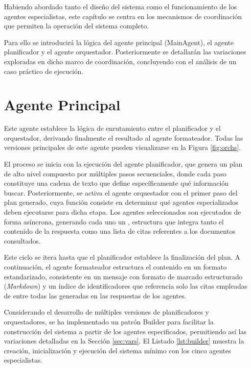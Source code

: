 Habiendo abordado tanto el diseño del sistema como el funcionamiento de los agentes especialistas, este capítulo se centra en los mecanismos de coordinación que permiten la operación del sistema completo.

Para ello se introducirá la lógica del agente principal (MainAgent), el agente planificador y el agente orquestador. Posteriormente se detallarán las variaciones exploradas en dicho marco de coordinación, concluyendo con el análisis de un caso práctico de ejecución.

\section{Agente Principal}
\label{sec:principal}
Este agente establece la lógica de enrutamiento entre el planificador y el orquestador, derivando finalmente el resultado al agente formateador. Todas las versiones principales de este agente pueden visualizarse en la Figura \ref{fig:orchs}.

El proceso se inicia con la ejecución del agente planificador, que genera un plan de alto nivel compuesto por múltiples pasos secuenciales, donde cada paso constituye una cadena de texto que define específicamente qué información buscar. Posteriormente, se activa el agente orquestador con el primer paso del plan generado, cuya función consiste en determinar qué agentes especializados deben ejecutarse para dicha etapa. Los agentes seleccionados son ejecutados de forma asíncrona, generando cada uno un , estructura que integra tanto el contenido de la respuesta como una lista de citas referentes a los documentos consultados.

Este ciclo se itera hasta que el planificador establece la finalización del plan. A continuación, el agente formateador estructura el contenido en un formato estandarizado, consistente en un mensaje con formato de marcado estructurado (\textit{Markdown}) y un índice de identificadores que referencia solo las citas empleadas de entre todas las generadas en las respuestas de los agentes.

Considerando el desarrollo de múltiples versiones de planificadores y orquestadores, se ha implementado un patrón Builder para facilitar la construcción del sistema a partir de los agentes especificados, permitiendo así las variaciones detalladas en la Sección \ref{sec:vars}. El Listado \ref{lst:builder} muestra la creación, inicialización y ejecución del sistema mínimo con los cinco agentes especialistas.

